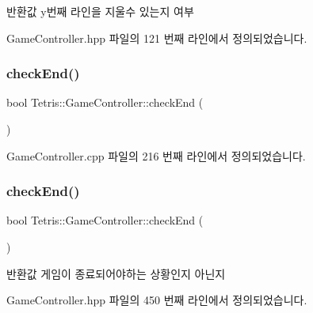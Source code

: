 \begin{DoxyReturn}{반환값}
y번째 라인을 지울수 있는지 여부 
\end{DoxyReturn}


Game\+Controller.\+hpp 파일의 121 번째 라인에서 정의되었습니다.

\mbox{\label{class_tetris_1_1_game_controller_ac8058c827eaa393194dcfb83c6964f8a}} 
\subsubsection{\texorpdfstring{check\+End()}{checkEnd()}\hspace{0.1cm}{\footnotesize\ttfamily [1/2]}}
{\footnotesize\ttfamily bool Tetris\+::\+Game\+Controller\+::check\+End (\begin{DoxyParamCaption}{ }\end{DoxyParamCaption})}



Game\+Controller.\+cpp 파일의 216 번째 라인에서 정의되었습니다.

\mbox{\label{class_tetris_1_1_game_controller_ac8058c827eaa393194dcfb83c6964f8a}} 
\subsubsection{\texorpdfstring{check\+End()}{checkEnd()}\hspace{0.1cm}{\footnotesize\ttfamily [2/2]}}
{\footnotesize\ttfamily bool Tetris\+::\+Game\+Controller\+::check\+End (\begin{DoxyParamCaption}{ }\end{DoxyParamCaption})\hspace{0.3cm}{\ttfamily [inline]}}

\begin{DoxyReturn}{반환값}
게임이 종료되어야하는 상황인지 아닌지 
\end{DoxyReturn}


Game\+Controller.\+hpp 파일의 450 번째 라인에서 정의되었습니다.

